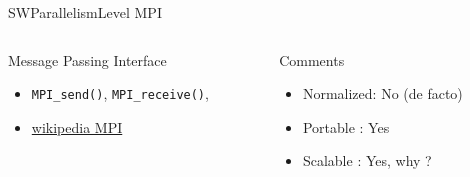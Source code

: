 %
\begin{Frame}{SWParallelismLevel MPI}
  \begin{columns}[t]
    \begin{column}{5cm} %
      \begin{block}{Message Passing Interface}
        \begin{itemize}
        \item \texttt{MPI_send()}, \texttt{MPI_receive()}, 
        \item
          \href{https://en.wikipedia.org/wiki/Message_Passing_Interface}{wikipedia
          MPI}
        \end{itemize}
      \end{block} 
    \end{column}
    
    \begin{column}{5cm} %
      \begin{alertblock}{Comments}
        \begin{itemize}
        \item Normalized: No (de facto)
        \item Portable : Yes
        \item Scalable : Yes, why ?
        \end{itemize}
      \end{alertblock}   
    \end{column}
  \end{columns}  
\end{Frame}


